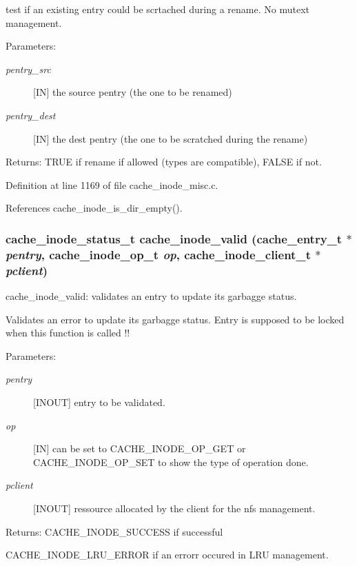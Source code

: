 test if an existing entry could be scrtached during a rename. No mutext management.

\begin{Desc}
\item[Parameters:]
\begin{description}
\item[{\em pentry\_\-src}][IN] the source pentry (the one to be renamed) \item[{\em pentry\_\-dest}][IN] the dest pentry (the one to be scratched during the rename)\end{description}
\end{Desc}
\begin{Desc}
\item[Returns:]TRUE if rename if allowed (types are compatible), FALSE if not. \end{Desc}


Definition at line 1169 of file cache\_\-inode\_\-misc.c.

References cache\_\-inode\_\-is\_\-dir\_\-empty().
\subsubsection{\setlength{\rightskip}{0pt plus 5cm}cache\_\-inode\_\-status\_\-t cache\_\-inode\_\-valid (cache\_\-entry\_\-t $\ast$ {\em pentry}, cache\_\-inode\_\-op\_\-t {\em op}, cache\_\-inode\_\-client\_\-t $\ast$ {\em pclient})}\label{cache__inode__misc_8c_a6}


cache\_\-inode\_\-valid: validates an entry to update its garbagge status.

Validates an error to update its garbagge status. Entry is supposed to be locked when this function is called !!

\begin{Desc}
\item[Parameters:]
\begin{description}
\item[{\em pentry}][INOUT] entry to be validated. \item[{\em op}][IN] can be set to CACHE\_\-INODE\_\-OP\_\-GET or CACHE\_\-INODE\_\-OP\_\-SET to show the type of operation done. \item[{\em pclient}][INOUT] ressource allocated by the client for the nfs management.\end{description}
\end{Desc}
\begin{Desc}
\item[Returns:]CACHE\_\-INODE\_\-SUCCESS if successful \par
 

CACHE\_\-INODE\_\-LRU\_\-ERROR if an errorr occured in LRU management. \end{Desc}


